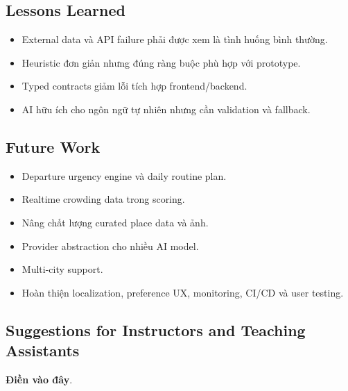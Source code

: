 \documentclass[12pt,a4paper]{article}
\newcommand{\dienvao}{\textbf{Điền vào đây}}
\begin{document}
\subsection{Lessons Learned}


\begin{itemize}
    \item External data và API failure phải được xem là tình huống bình thường.
    \item Heuristic đơn giản nhưng đúng ràng buộc phù hợp với prototype.
    \item Typed contracts giảm lỗi tích hợp frontend/backend.
    \item AI hữu ích cho ngôn ngữ tự nhiên nhưng cần validation và fallback.
\end{itemize}

\subsection{Future Work}


\begin{itemize}
    \item Departure urgency engine và daily routine plan.
    \item Realtime crowding data trong scoring.
    \item Nâng chất lượng curated place data và ảnh.
    \item Provider abstraction cho nhiều AI model.
    \item Multi-city support.
    \item Hoàn thiện localization, preference UX, monitoring, CI/CD và user testing.
\end{itemize}

\subsection{Suggestions for Instructors and Teaching Assistants}


\dienvao.
\end{document}
